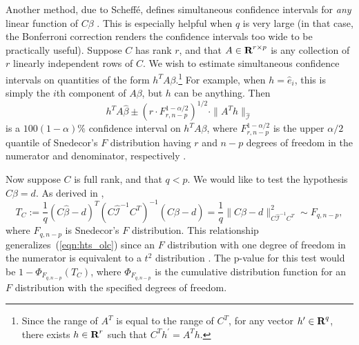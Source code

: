 \documentclass[12pt]{article}
\begin{document}
Another method, due to Scheff\'e, defines simultaneous confidence intervals for \textit{any} linear function of $C\beta$ \cite{Scheffe:1959}. This is especially helpful when $q$ is very large (in that case, the Bonferroni correction renders the confidence intervals too wide to be practically useful). Suppose $C$ has rank $r$, and that $A \in {\mbox{\bf R}}^{r \times p}$ is any collection of $r$ linearly independent rows of $C$. We wish to estimate simultaneous confidence intervals on quantities of the form $h^T A \beta$.\footnote{Since the range of $A^T$ is equal to the range of $C^T$, for any vector $h^\prime \in {\mbox{\bf R}}^q$, there exists $h \in {\mbox{\bf R}}^r$ such that $C^T h^\prime = A^T h$.} For example, when $h = \hat{e}_i$, this is simply the $i$th component of $A \beta$, but $h$ can be anything. Then
\begin{displaymath}
   h^T A \hat{\beta} \pm (r \cdot F_{r, n-p}^{1-\alpha/2})^{1/2} \cdot \| A^T h \|_{\hat{\mathcal{I}}}
\end{displaymath}
is a $100(1-\alpha)\%$ confidence interval on $h^T A \beta$, where $F_{r, n-p}^{1-\alpha/2}$ is the upper $\alpha/2$ quantile of Snedecor's $F$ distribution having $r$ and $n-p$ degrees of freedom in the numerator and denominator, respectively \cite[\S~5.1.1]{Seber:2003}.

Now suppose $C$ is full rank, and that $q < p$. We would like to test the hypothesis $C \beta = d$. As derived in \cite[\S~1.3.4]{Wood:2017},
\begin{displaymath}
   T_C := \frac{1}{q} (C \hat{\beta} - d)^T (C \hat{\mathcal{I}}^{-1} C^T)^{-1} (C \hat{\beta} - d) = \frac{1}{q}\| C \hat{\beta} - d \|_{C \hat{\mathcal{I}}^{-1} C^T}^2 \sim F_{q, n-p},
\end{displaymath}
where $F_{q, n-p}$ is Snedecor's $F$ distribution. This relationship generalizes~(\ref{eqn:hts_olc}) since an $F$ distribution with one degree of freedom in the numerator is equivalent to a $t^2$ distribution \cite[\S~3.5.3]{Weisberg:2005}. The p-value for this test would be $1 - \Phi_{F_{q, n-p}}(T_C)$, where $\Phi_{F_{q, n-p}}$ is the cumulative distribution function for an $F$ distribution with the specified degrees of freedom.
\end{document}
